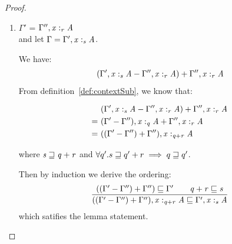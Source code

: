 \begin{proof}
\begin{enumerate}
     \item $\Gamma'$ = $\Gamma''  \GRANULEsym{,}   \GRANULEmv{x}  :_{\textcolor{coeffectColor}{  \GRANULEnt{r}  } }   \GRANULEnt{A}$\\
       and let $\Gamma = \Gamma'  \GRANULEsym{,}   \GRANULEmv{x}  :_{\textcolor{coeffectColor}{  \GRANULEnt{s}  } }   \GRANULEnt{A}$.

     We have:
     \begin{align*}
       (\Gamma'  \GRANULEsym{,}   \GRANULEmv{x}  :_{\textcolor{coeffectColor}{  \GRANULEnt{s}  } }   \GRANULEnt{A} - \Gamma''  \GRANULEsym{,}   \GRANULEmv{x}  :_{\textcolor{coeffectColor}{  \GRANULEnt{r}  } }   \GRANULEnt{A}) + \Gamma''  \GRANULEsym{,}   \GRANULEmv{x}  :_{\textcolor{coeffectColor}{  \GRANULEnt{r}  } }   \GRANULEnt{A}
     \end{align*}
     From definition~\ref{def:contextSub}, we know that:

       \begin{align*}
      & (\Gamma'  \GRANULEsym{,}   \GRANULEmv{x}  :_{\textcolor{coeffectColor}{  \GRANULEnt{s}  } }   \GRANULEnt{A} - \Gamma''  \GRANULEsym{,}   \GRANULEmv{x}  :_{\textcolor{coeffectColor}{  \GRANULEnt{r}  } }   \GRANULEnt{A}) + \Gamma''  \GRANULEsym{,}   \GRANULEmv{x}  :_{\textcolor{coeffectColor}{  \GRANULEnt{r}  } }   \GRANULEnt{A} \\
    =\ & \GRANULEsym{(}  \Gamma'  \GRANULEsym{-}  \Gamma''  \GRANULEsym{)}  \GRANULEsym{,}   \GRANULEmv{x}  :_{\textcolor{coeffectColor}{  \GRANULEnt{q}  } }   \GRANULEnt{A} + \Gamma''  \GRANULEsym{,}   \GRANULEmv{x}  :_{\textcolor{coeffectColor}{  \GRANULEnt{r}  } }   \GRANULEnt{A} \\
    =\ & \GRANULEsym{(}  \GRANULEsym{(}  \Gamma'  \GRANULEsym{-}  \Gamma''  \GRANULEsym{)}  \GRANULEsym{+}  \Gamma''  \GRANULEsym{)}  \GRANULEsym{,}   \GRANULEmv{x}  :_{\textcolor{coeffectColor}{   \GRANULEnt{q}  \GRANULEsym{+}  \GRANULEnt{r}   } }   \GRANULEnt{A}
       \end{align*}

     where $\GRANULEnt{s}  \sqsupseteq  \GRANULEnt{q}  \GRANULEsym{+}  \GRANULEnt{r}$ and $\maximal{q}{q'}{s}{q' + r}$.

     Then by induction we derive the ordering:
     \begin{align*}
       \dfrac{\GRANULEsym{(}  \GRANULEsym{(}  \Gamma'  \GRANULEsym{-}  \Gamma''  \GRANULEsym{)}  \GRANULEsym{+}  \Gamma''  \GRANULEsym{)} \sqsubseteq \Gamma' \qquad \GRANULEnt{q}  \GRANULEsym{+}  \GRANULEnt{r}  \sqsubseteq \GRANULEnt{s}}
            {\GRANULEsym{(}  \GRANULEsym{(}  \Gamma'  \GRANULEsym{-}  \Gamma''  \GRANULEsym{)}  \GRANULEsym{+}  \Gamma''  \GRANULEsym{)}  \GRANULEsym{,}   \GRANULEmv{x}  :_{\textcolor{coeffectColor}{   \GRANULEnt{q}  \GRANULEsym{+}  \GRANULEnt{r}   } }   \GRANULEnt{A} \sqsubseteq \Gamma'  \GRANULEsym{,}   \GRANULEmv{x}  :_{\textcolor{coeffectColor}{  \GRANULEnt{s}  } }   \GRANULEnt{A}}
     \end{align*}
     which satifies the lemma statement.
 \end{enumerate}
\end{proof}

